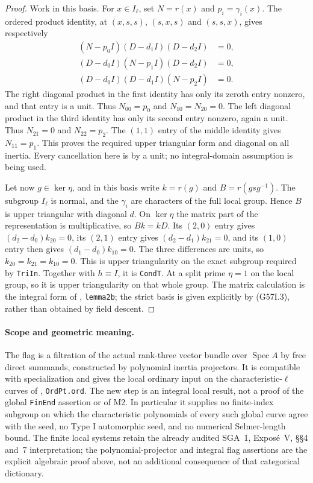 \begin{proof}
Work in this basis.  For $x\in I_\ell$, set $N=r(x)$
and $p_i=\gamma_i(x)$.  The ordered product identity,
at $(x,s,s)$, $(s,x,s)$ and $(s,s,x)$, gives respectively
\[
\begin{split}
 (N-p_0I)(D-d_1I)(D-d_2I)&=0,\\
 (D-d_0I)(N-p_1I)(D-d_2I)&=0,\\
 (D-d_0I)(D-d_1I)(N-p_2I)&=0.
\end{split}                                                   \tag{G57I.4}
\]
The right diagonal product in the first identity has only
its zeroth entry nonzero, and that entry is a unit.
Thus $N_{00}=p_0$ and $N_{10}=N_{20}=0$.  The left
diagonal product in the third identity has only its second
entry nonzero, again a unit.  Thus $N_{21}=0$ and
$N_{22}=p_2$.  The $(1,1)$ entry of the middle identity
gives $N_{11}=p_1$.  This proves the required upper
triangular form and diagonal on all inertia.  Every
cancellation here is by a unit; no integral-domain
assumption is being used.

Let now $g\in\ker\eta$, and in this basis write
$k=r(g)$ and $B=r(gsg^{-1})$.  The subgroup $I_\ell$
is normal, and the $\gamma_i$ are characters of the full
local group.  Hence $B$ is upper triangular with diagonal
$d$.  On $\ker\eta$ the matrix part of the representation
is multiplicative, so $Bk=kD$.  Its $(2,0)$ entry gives
$(d_2-d_0)k_{20}=0$, its $(2,1)$ entry gives
$(d_2-d_1)k_{21}=0$, and its $(1,0)$ entry then gives
$(d_1-d_0)k_{10}=0$.  The three differences are units,
so $k_{20}=k_{21}=k_{10}=0$.  This is upper
triangularity on the exact subgroup required by
\texttt{TriIn}.  Together with $h\equiv I$, it is
\texttt{CondT}.  At a split prime $\eta=1$ on the local
group, so it is upper triangularity on that whole group.
The matrix calculation is the integral form of
,
\texttt{lemma2b}; the strict basis is given explicitly
by (G57I.3), rather than obtained by field descent.
\end{proof}

\paragraph{Scope and geometric meaning.}
The flag is a filtration of the actual rank-three vector
bundle over $\operatorname{Spec}A$ by free direct summands,
constructed by polynomial inertia projectors.  It is
compatible with specialization and gives the local ordinary
input on the characteristic-$\ell$ curves of
, \texttt{OrdPt.ord}.
The new step is an integral local result, not a proof of
the global \texttt{FinEnd} assertion or of M2.  In
particular it supplies no finite-index subgroup on which
the characteristic polynomials of every such global curve
agree with the seed, no Type I automorphic seed, and no
numerical Selmer-length bound.
The finite local systems retain the already audited
SGA~1, Expos\'e~V, \S\S4 and~7 interpretation; the
polynomial-projector and integral flag assertions are
the explicit algebraic proof above, not an additional
consequence of that categorical dictionary.
